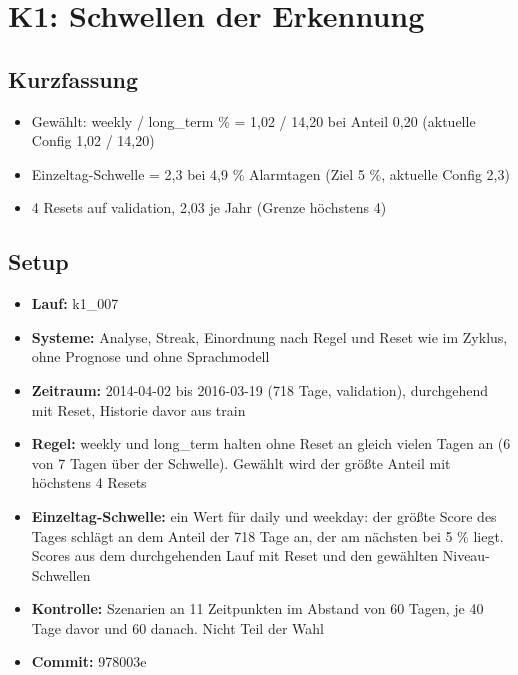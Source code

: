 \section{K1: Schwellen der Erkennung}
\label{app:report_k1}
\subsection*{Kurzfassung}
\begin{itemize}
\item Gewählt: weekly / long\_\allowbreak{}term \% = 1,02 / 14,20 bei Anteil 0,20 (aktuelle Config 1,02 / 14,20)
\item Einzeltag-Schwelle = 2,3 bei 4,9 \% Alarmtagen (Ziel 5 \%, aktuelle Config 2,3)
\item 4 Resets auf validation, 2,03 je Jahr (Grenze höchstens 4)
\end{itemize}
\subsection*{Setup}
\begin{itemize}
\item \textbf{Lauf:} k1\_\allowbreak{}007
\item \textbf{Systeme:} Analyse, Streak, Einordnung nach Regel und Reset wie im Zyklus, ohne Prognose und ohne Sprachmodell
\item \textbf{Zeitraum:} 2014-04-02 bis 2016-03-19 (718 Tage, validation), durchgehend mit Reset, Historie davor aus train
\item \textbf{Regel:} weekly und long\_\allowbreak{}term halten ohne Reset an gleich vielen Tagen an (6 von 7 Tagen über der Schwelle). Gewählt wird der größte Anteil mit höchstens 4 Resets
\item \textbf{Einzeltag-Schwelle:} ein Wert für daily und weekday: der größte Score des Tages schlägt an dem Anteil der 718 Tage an, der am nächsten bei 5 \% liegt. Scores aus dem durchgehenden Lauf mit Reset und den gewählten Niveau-Schwellen
\item \textbf{Kontrolle:} Szenarien an 11 Zeitpunkten im Abstand von 60 Tagen, je 40 Tage davor und 60 danach. Nicht Teil der Wahl
\item \textbf{Commit:} 978003e
\end{itemize}

